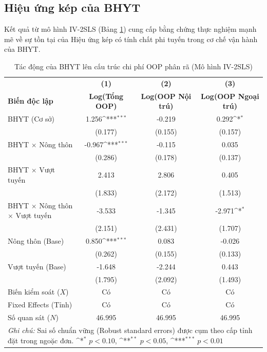 \documentclass[12pt,a4paper]{article}
\begin{document}
\clearpage
\subsection{Hiệu ứng kép của BHYT}

Kết quả từ mô hình IV-2SLS (Bảng \ref{tab:decomposed_oop}) cung cấp bằng chứng thực nghiệm mạnh mẽ về sự tồn tại của Hiệu ứng kép có tính chất phi tuyến trong cơ chế vận hành của BHYT.

\begin{table}[htbp]
	\centering
	\def\sym#1{\ifmmode^{#1}\else\(^{#1}\)\fi}
	\caption{Tác động của BHYT lên cấu trúc chi phí OOP phân rã (Mô hình IV-2SLS)}
	\label{tab:decomposed_oop}
	\begin{tabular}{lccc}
		\toprule
		&\textbf{(1)}&\textbf{(2)}&\textbf{(3)}\\
		\textbf{Biến độc lập}&\textbf{Log(Tổng OOP)}&\textbf{Log(OOP Nội trú)}&\textbf{Log(OOP Ngoại trú)}\\
		\midrule
		BHYT (Cơ sở) & 1.256\sym{***} & -0.219 & 0.292\sym{*} \\
		& (0.177) & (0.155) & (0.157) \\
		\addlinespace
		BHYT $\times$ Nông thôn & -0.967\sym{***} & -0.115 & 0.035 \\
		& (0.286) & (0.178) & (0.137) \\
		\addlinespace
		BHYT $\times$ Vượt tuyến & 2.413 & 2.806 & 0.405 \\
		& (1.833) & (2.172) & (1.513) \\
		\addlinespace
		BHYT $\times$ Nông thôn $\times$ Vượt tuyến & -3.533 & -1.345 & -2.971\sym{*} \\
		& (2.151) & (2.431) & (1.707) \\
		\addlinespace
		Nông thôn (Base) & 0.850\sym{***} & 0.083 & -0.026 \\
		& (0.262) & (0.155) & (0.133) \\
		\addlinespace
		Vượt tuyến (Base) & -1.648 & -2.244 & 0.443 \\
		& (1.795) & (2.092) & (1.493) \\
		\midrule
		Biến kiểm soát ($X$) & Có & Có & Có \\
		Fixed Effects (Tỉnh) & Có & Có & Có \\
		\midrule
		Số quan sát ($N$) & 46.995 & 46.995 & 46.995 \\
		\bottomrule
		\multicolumn{4}{p{13cm}}{\footnotesize \textit{Ghi chú:} Sai số chuẩn vững (Robust standard errors) được cụm theo cấp tỉnh đặt trong ngoặc đơn. \newline \sym{*} \(p<0.10\), \sym{**} \(p<0.05\), \sym{***} \(p<0.01\)}
	\end{tabular}
\end{table}
\end{document}
